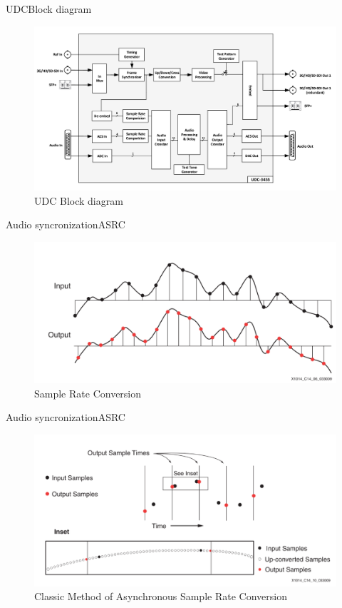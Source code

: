 \begin{frame}{UDC}{Block diagram}
	\begin{figure}
		\centering
		\includegraphics[scale=1]{graphics/block_diagram.png}
		\caption{UDC Block diagram}
	\end{figure}
\end{frame}
\begin{frame}{Audio syncronization}{ASRC}
	\begin{figure}
		\centering
		\includegraphics[scale=1]{graphics/asrc1.png}
		\caption{Sample Rate Conversion}
	\end{figure}
\end{frame}
\begin{frame}{Audio syncronization}{ASRC}
	\begin{figure}
		\centering
		\includegraphics[scale=1]{graphics/asrc2.png}
		\caption{Classic Method of Asynchronous Sample Rate Conversion}
	\end{figure}
\end{frame}
